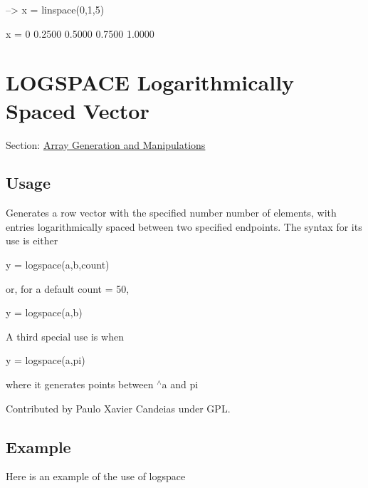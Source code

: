 \begin{DoxyVerbInclude}
--> x = linspace(0,1,5)

x = 
         0    0.2500    0.5000    0.7500    1.0000 
\end{DoxyVerbInclude}
 \hypertarget{array_logspace}{}\section{L\-O\-G\-S\-P\-A\-C\-E Logarithmically Spaced Vector}\label{array_logspace}
Section\-: \hyperlink{sec_array}{Array Generation and Manipulations} \hypertarget{vtkwidgets_vtkxyplotwidget_Usage}{}\subsection{Usage}\label{vtkwidgets_vtkxyplotwidget_Usage}
Generates a row vector with the specified number number of elements, with entries logarithmically spaced between two specified endpoints. The syntax for its use is either \begin{DoxyVerb}    y = logspace(a,b,count)
\end{DoxyVerb}
 or, for a default {\ttfamily count = 50}, \begin{DoxyVerb}    y = logspace(a,b)
\end{DoxyVerb}
 A third special use is when \begin{DoxyVerb}    y = logspace(a,pi)
\end{DoxyVerb}
 where it generates points between {$^\wedge$a} and {\ttfamily pi}

Contributed by Paulo Xavier Candeias under G\-P\-L. \hypertarget{variables_struct_Example}{}\subsection{Example}\label{variables_struct_Example}
Here is an example of the use of {\ttfamily logspace}


